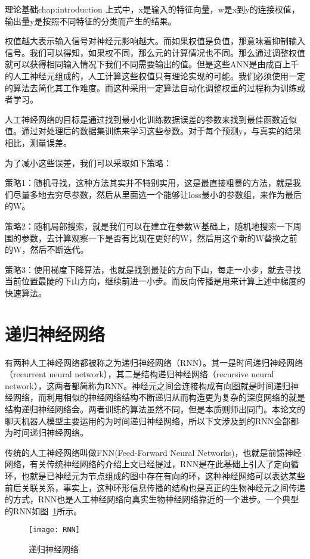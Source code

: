 \begin{cuzchapter}{理论基础}{chap:introduction}
上式中，x是输入的特征向量，w是x到y的连接权值，输出量y是按照不同特征的分类而产生的结果。

权值越大表示输入信号对神经元影响越大。而如果权值是负值，那意味着抑制输入信号。我们可以得知，如果权不同，那么元的计算情况也不同。那么通过调整权值就可以获得相同输入情况下我们不同需要输出的值。但是这些ANN是由成百上千的人工神经元组成的，人工计算这些权值只有理论实现的可能。我们必须使用一定的算法去简化其工作难度。而这种采用一定算法自动化调整权重的过程称为训练或者学习。

人工神经网络的目标是通过找到最小化训练数据误差的参数来找到最佳函数近似值。通过对处理后的数据集训练来学习这些参数。对于每个预测y，与真实的结果相比，测量误差。

为了减小这些误差，我们可以采取如下策略：

策略1：随机寻找，这种方法其实并不特别实用，这是最直接粗暴的方法，就是我们尽量多地去穷尽参数，然后从里面选一个能够让loss最小的参数组，来作为最后的W。

策略2：随机局部搜索，就是我们可以在建立在参数W基础上，随机地搜索一下周围的参数，去计算观察一下是否有比现在更好的W，然后用这个新的W替换之前的W，然后不断迭代。

策略3：使用梯度下降算法，也就是找到最陡的方向下山，每走一小步，就去寻找当前位置最陡的下山方向，继续前进一小步。而反向传播是用来计算上述中梯度的快速算法。
\section{递归神经网络}\label{sec:background}
有两种人工神经网络都被称之为递归神经网络（RNN）\cite{DBLP:journals/corr/KannanKRKTMCLGY16}。其一是时间递归神经网络（recurrent neural network），其二是结构递归神经网络（recursive neural network），这两者都简称为RNN。神经元之间会连接构成有向图就是时间递归神经网络，而利用相似的神经网络结构不断递归从而构造更为复杂的深度网络的就是结构递归神经网络会。两者训练的算法虽然不同，但是本质则师出同门。本论文的聊天机器人模型主要运用的为时间递归神经网络，所以下文涉及到的RNN全部都为时间递归神经网络。

传统的人工神经网络叫做FNN(Feed-Forward Neural Networks)，也就是前馈神经网络，有关传统神经网络的介绍上文已经提过，RNN是在此基础上引入了定向循环，也就是已神经元为节点组成的图中存在有向的环，这种神经网络可以表达某些前后关联关系，事实上，这种环形信息传播的结构也是真正的生物神经元之间传递的方式，RNN也是人工神经网络向真实生物神经网络靠近的一个进步\cite{Goodfellow-et-al-2016}。一个典型的RNN如图~\ref{RNN}所示。
\begin{figure}[!htbp]
    \centering
    \texttt{[image: RNN]}
    \caption[RNN]{递归神经网络}
    \label{RNN}
\end{figure}


\end{cuzchapter}
